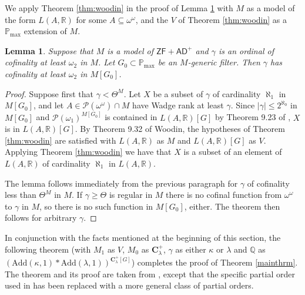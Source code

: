 \documentclass[12pt]{article}
\newtheorem{lemma}[theorem]{Lemma}
\def\bbC{{\mathbf{C}}}
\newcommand{\AD}{\mathsf{AD}}
\newcommand{\Add}{\mathrm{Add}}
\newcommand{\pmax}{\mathbb{P}_{\mathrm{max}}}
\newcommand{\bbQ}{\mathbb{Q}}
\newcommand{\bbR}{\mathbb{R}}
\newcommand{\breals}{\omega^{\omega}}
\newcommand{\DC}{\mathsf{DC}}
\newcommand{\cP}{\mathcal{P}}
\newcommand{\Pmax}{\pmax}
\newcommand{\ZF}{\mathsf{ZF}}
\begin{document}
We apply Theorem \ref{thm:woodin} in the proof of Lemma \ref{lemma:coflemma} with $M$ as a model of the form $L(A,\bbR)$ for some $A \subseteq \breals$, and the $V$ of Theorem \ref{thm:woodin} as a $\pmax$ extension of $M$.




\begin{lemma} \label{lemma:coflemma}
Suppose that $M$ is a model of $\ZF + \AD^{+}$ and $\gamma$ is an ordinal of cofinality at least
$\omega_{2}$ in $M$.
Let $G_0\subset \pmax$ be an $M$-generic filter. Then $\gamma$ has cofinality at least $\omega_{2}$ in
$M[G_0]$.
\end{lemma}

\begin{proof}
Suppose first that $\gamma < \Theta^{M}$. Let $X$ be a subset of $\gamma$ of cardinality $\aleph_{1}$ in $M[G_0]$,
and let $A \in \cP(\breals) \cap M$ have Wadge rank at least $\gamma$. Since $|\gamma| \leq 2^{\aleph_{0}}$ in $M[G_{0}]$ and $\mathcal{P}(\omega_{1})^{M[G_0]}$ is contained in $L(A, \mathbb{R})[G]$ by Theorem 9.23 of \cite{Woodin},
$X$ is in $L(A, \mathbb{R})[G]$. By Theorem 9.32 of Woodin, the hypotheses of Theorem \ref{thm:woodin} are satisfied with $L(A, \bbR)$ as $M$ and $L(A, \bbR)[G]$ as $V$.
Applying Theorem \ref{thm:woodin} we have that $X$ is a subset of an element
of $L(A, \mathbb{R})$ of cardinality $\aleph_{1}$ in $L(A, \mathbb{R})$.

The lemma follows immediately from the previous paragraph for $\gamma$ of cofinality less than $\Theta^{M}$ in $M$.
If $\gamma \geq \Theta$ is regular in $M$ there is no cofinal function from $\breals$ to $\gamma$ in $M$, so there is no such
function in $M[G_0]$, either.
The theorem then follows for arbitrary $\gamma$.
\end{proof}



In conjunction with the facts mentioned at the beginning of this section, the following theorem (with $M_{1}$ as $V$, $M_{0}$ as $\bbC^{+}_{\lambda}$, $\gamma$ as either $\kappa$ or $\lambda$ and $\bbQ$ as $(\Add(\kappa,1) * \Add(\lambda,1))^{\bbC^{+}_{\lambda}[G]}$) completes the proof of Theorem \ref{mainthrm}.
The theorem and its proof are taken from \cite{SquarePaper}, except that the specific partial order used in \cite{SquarePaper} has been replaced with a more general class of partial orders.
\end{document}
